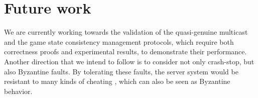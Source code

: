 \documentclass[]{usiinfprospectus}
\begin{document}
% 
% 
% 
% 
% 
% 
% 
% 
% 
% 
% 

\section{Future work} \label{sec:futurework}

We are currently working towards the validation of the quasi-genuine multicast and the game state consistency management protocols, which require both correctness proofs and experimental results, to demonstrate their performance. Another direction that we intend to follow is to consider not only crash-stop, but also Byzantine faults. By tolerating these faults, the server system would be resistant to many kinds of cheating \cite{yan2005scc}, which can also be seen as Byzantine behavior.
\end{document}
